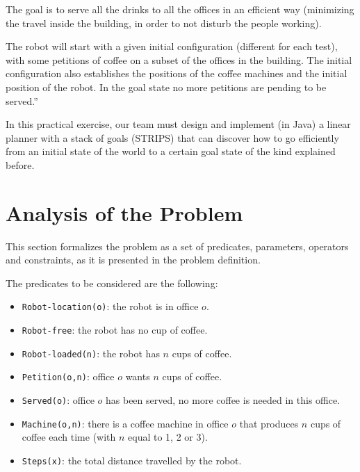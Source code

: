\documentclass[12pt,a4paper,oneside]{article}
\numberwithin{equation}{section}
\numberwithin{equation}{section}
\theoremstyle{definition}
\begin{document}
The goal is to serve all the drinks to all the offices in an efficient way (minimizing the travel inside the building, in order to not disturb the people working).


The robot will start with a given initial configuration (different for each test), with some petitions of coffee on a subset of the offices in the building. The initial configuration also establishes the positions of the coffee machines and the initial position of the robot. In the goal state no more petitions are pending to be served.”


In this practical exercise, our team must design and implement (in Java) a linear planner with a stack of goals (STRIPS) that can discover how to go efficiently from an initial state of the world to a certain goal state of the kind explained before.


\newpage

\section{Analysis of the Problem} \label{Analysis of the Problem}

This section formalizes the problem as a set of predicates, parameters, operators and constraints, as it is presented in the problem definition\cite{problemdefinition}.


The predicates to be considered are the following:
\begin{itemize}
	\item \texttt{Robot-location(o)}: the robot is in office $o$.
	\item \texttt{Robot-free}: the robot has no cup of coffee.
	\item \texttt{Robot-loaded(n)}: the robot has $n$ cups of coffee.
	\item \texttt{Petition(o,n)}: office $o$ wants $n$ cups of coffee.
	\item \texttt{Served(o)}: office $o$ has been served, no more coffee is needed in this office.
	\item \texttt{Machine(o,n)}: there is a coffee machine in office $o$ that produces $n$ cups of coffee each time (with $n$ equal to 1, 2 or 3).
	\item \texttt{Steps(x)}: the total distance travelled by the robot.
\end{itemize}
\end{document}

